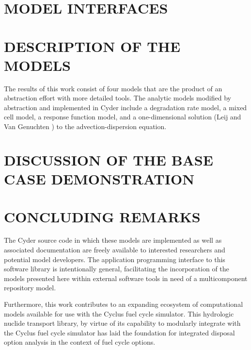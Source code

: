 \documentclass[letterpaper]{article}
\begin{document}
\section*{MODEL INTERFACES}



\section*{DESCRIPTION OF THE MODELS}

The results of this work consist of four models that are the product of an 
abstraction effort with more detailed tools.  The analytic models modified by 
abstraction and implemented in Cyder include a degradation rate model, a mixed 
cell model, a response function model, and a one-dimensional solution (Leij and 
Van Genuchten \cite{leij_analytical_1991}) to the advection-dispersion equation.










\section*{DISCUSSION OF THE BASE CASE DEMONSTRATION}


\section*{CONCLUDING REMARKS}
The Cyder source code in which these models are implemented as well as 
associated documentation are freely available to interested researchers and 
potential model developers. The application programming interface to this 
software library is intentionally general, facilitating the incorporation of the 
models presented here within external software tools in need of a multicomponent 
repository model.

Furthermore, this work contributes to an expanding ecosystem of computational 
models available for use with the Cyclus fuel cycle simulator. This hydrologic 
nuclide transport library, by virtue of its capability to modularly integrate 
with the Cyclus fuel cycle simulator has laid the foundation for integrated 
disposal option analysis in the context of fuel cycle options. 




\end{document}
